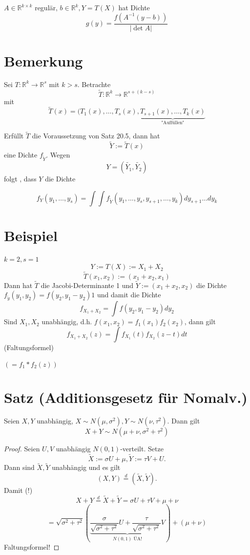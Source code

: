 \documentclass[a4paper,11pt,notitlepage]{report}
\newcommand{\R}{{\ensuremath{\mathbb{R}}}}
\begin{document}
$A \in \R^{k \times k}$ regulär, $b \in \R^k, Y = T(X)$ hat Dichte
$$g(y) = \frac{f(A^{-1}(y-b))}{|\det A|}$$

\section{Bemerkung}
Sei $T \colon \R^k \rightarrow \R^s$ mit $k>s$. Betrachte
$$\widetilde{T} \colon \R^k \rightarrow \R^{s+(k-s)}$$ mit
$$\widetilde{T}(x) = (T_1(x), \ldots, T_s(x), \underbrace{T_{s+1}(x), \ldots, T_k(x)}_{\text{"Auffüllen"}}$$

Erfüllt $\widetilde{T}$ die Voraussetzung von Satz 20.5, dann hat
$$\widetilde{Y} := \widetilde{T}(x)$$
eine Dichte $f_{\widetilde{Y}}$. Wegen
$$Y = (\widetilde{Y_1}, \widetilde{Y_2})$$
folgt , dass $Y$ die Dichte

$$f_Y(y_1, \ldots, y_s) = \int{ \int{f_{\widetilde{Y}}(y_1, \ldots, y_s, y_{s+1}, \ldots, y_k) dy_{s+1} \ldots dy_k}}$$

\section{Beispiel}
$k=2, s=1$
$$Y:= T(X) := X_1 + X_2$$
$$\widetilde{T}(x_1, x_2) := (x_1 + x_2, x_1)$$
Dann hat $\widetilde{T}$ die Jacobi-Determinante 1 und $\widetilde{Y} := (x_1 + x_2, x_2)$ die Dichte $f_{\widetilde{y}}(y_1, y_2) = f(y_2, y_1-y_2) 1$ und damit die Dichte
$$f_{X_1 + X_2} = \int f(y_2, y_1-y_2) dy_2$$
Sind $X_1, X_2$ unabhängig, d.h. $f(x_1, x_2) = f_1(x_1) f_2(x_2)$, dann gilt
$$f_{X_1 + X_2}(z) = \int f_{X_1}(t) f_{X_2}(z-t) dt$$
(Faltungsformel)

$(= f_1 * f_2 (z))$

\section{Satz (Additionsgesetz für Nomalv.)}
Seien $X,Y$ unabhängig, $X \sim N(\mu, \sigma^2), Y \sim N(\nu, \tau^2)$. Dann gilt
$$X + Y \sim N(\mu + \nu, \sigma^2 + \tau^2)$$

\begin{proof}
Seien $U,V$ unabhängig $N(0,1)$-verteilt. Setze
$$\widetilde{X} := \sigma U + \mu, \widetilde{Y} := \tau V + U.$$
Dann sind $\widetilde{X}, \widetilde{Y}$ unabhängig und es gilt
$$(X,Y) \overset{d}{=} (\widetilde{X}, \widetilde{Y}).$$
Damit (!)
$$X+Y \overset{d}{=} \widetilde{X} + \widetilde{Y} = \sigma U + \tau V + \mu + \nu$$
$$= \sqrt{\sigma^2 + \tau^2} (\underbrace{\frac{\sigma}{\sqrt{\sigma^2 + \tau^2}} U + \frac{\tau}{\sqrt{\sigma^2 + \tau^2}} V}_{N(0,1) \text{ ÜA!}}) + (\mu + \nu)$$
Faltungsformel!
\end{proof}
\end{document}
